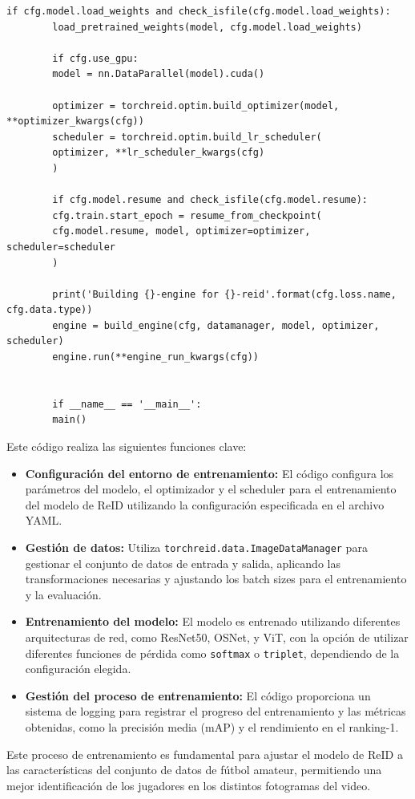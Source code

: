\documentclass[12pt, a4paper, twoside]{article}
\begin{document}
\begin{lstlisting}[style=pythonstyle]
		if cfg.model.load_weights and check_isfile(cfg.model.load_weights):
		load_pretrained_weights(model, cfg.model.load_weights)
		
		if cfg.use_gpu:
		model = nn.DataParallel(model).cuda()
		
		optimizer = torchreid.optim.build_optimizer(model, **optimizer_kwargs(cfg))
		scheduler = torchreid.optim.build_lr_scheduler(
		optimizer, **lr_scheduler_kwargs(cfg)
		)
		
		if cfg.model.resume and check_isfile(cfg.model.resume):
		cfg.train.start_epoch = resume_from_checkpoint(
		cfg.model.resume, model, optimizer=optimizer, scheduler=scheduler
		)
		
		print('Building {}-engine for {}-reid'.format(cfg.loss.name, cfg.data.type))
		engine = build_engine(cfg, datamanager, model, optimizer, scheduler)
		engine.run(**engine_run_kwargs(cfg))
		
		
		if __name__ == '__main__':
		main()
	\end{lstlisting}
	
	Este código realiza las siguientes funciones clave:
	
	\begin{itemize}
		\item \textbf{Configuración del entorno de entrenamiento:} El código configura los parámetros del modelo, el optimizador y el scheduler para el entrenamiento del modelo de ReID utilizando la configuración especificada en el archivo YAML.
		\item \textbf{Gestión de datos:} Utiliza \texttt{torchreid.data.ImageDataManager} para gestionar el conjunto de datos de entrada y salida, aplicando las transformaciones necesarias y ajustando los batch sizes para el entrenamiento y la evaluación.
		\item \textbf{Entrenamiento del modelo:} El modelo es entrenado utilizando diferentes arquitecturas de red, como ResNet50, OSNet, y ViT, con la opción de utilizar diferentes funciones de pérdida como \texttt{softmax} o \texttt{triplet}, dependiendo de la configuración elegida.
		\item \textbf{Gestión del proceso de entrenamiento:} El código proporciona un sistema de logging para registrar el progreso del entrenamiento y las métricas obtenidas, como la precisión media (mAP) y el rendimiento en el ranking-1.
	\end{itemize}
	
	Este proceso de entrenamiento es fundamental para ajustar el modelo de ReID a las características del conjunto de datos de fútbol amateur, permitiendo una mejor identificación de los jugadores en los distintos fotogramas del video.
	
\end{document}

